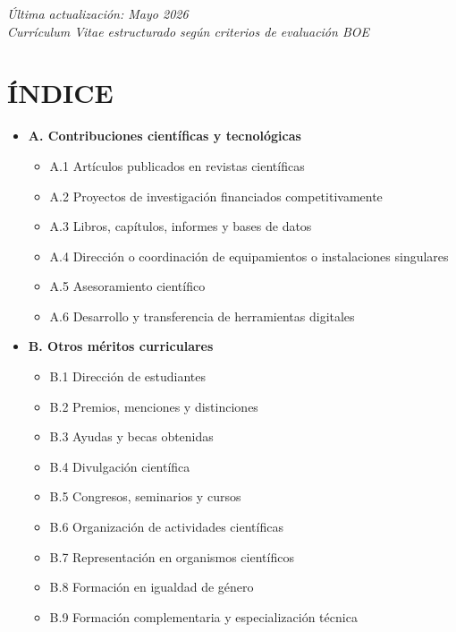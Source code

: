 \documentclass[11pt,a4paper]{article}
\begin{document}
\begin{center}
\color{darkgray}\small
\textit{Última actualización: Mayo 2026}\\
\vspace{0.5em}
\textit{Currículum Vitae estructurado según criterios de evaluación BOE}
\end{center}

\newpage

\clearpage
\section*{ÍNDICE}

\small
\begin{itemize}[leftmargin=*, itemsep=0.35em]

\item \textbf{A. Contribuciones científicas y tecnológicas}
  \begin{itemize}[leftmargin=1.2em]
    \item A.1 Artículos publicados en revistas científicas
    \item A.2 Proyectos de investigación financiados competitivamente
    \item A.3 Libros, capítulos, informes y bases de datos
    \item A.4 Dirección o coordinación de equipamientos o instalaciones singulares
    \item A.5 Asesoramiento científico
    \item A.6 Desarrollo y transferencia de herramientas digitales
  \end{itemize}

\item \textbf{B. Otros méritos curriculares}
  \begin{itemize}[leftmargin=1.2em]
    \item B.1 Dirección de estudiantes
    \item B.2 Premios, menciones y distinciones
    \item B.3 Ayudas y becas obtenidas
    \item B.4 Divulgación científica
    \item B.5 Congresos, seminarios y cursos
    \item B.6 Organización de actividades científicas
    \item B.7 Representación en organismos científicos
    \item B.8 Formación en igualdad de género
    \item B.9 Formación complementaria y especialización técnica
  \end{itemize}


\end{itemize}
\end{document}
